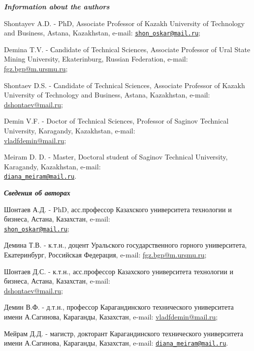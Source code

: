 \begin{authorinfo}
\emph{{\bfseries Information about the authors}}

Shontayev A.D. - PhD, Associate Professor of Kazakh University of
Technology and Business, Astana, Kazakhstan, e-mail: \href{mailto:shon_oskar@mail.ru}{\nolinkurl{shon\_oskar@mail.ru}};

Demina T.V. - Сandidate of Technical Sciences, Associate Professor of
Ural State Mining University, Ekaterinburg, Russian Federation, 
e-mail: \href{mailto:baiz76@mail.ru}{fgz.bgp@m.ursmu.ru};

Shontaev D.S. - Сandidate of Technical Sciences, Associate Professor of
Kazakh University of Technology and Business, Astana, Kazakhstan, 
e-mail: \href{mailto:baiz76@mail.ru}{dshontaev@mail.ru};

Demin V.F. - Doctor of Technical Sciences, Professor of Saginov
Technical University, Karagandy, Kazakhstan, 
e-mail: \\\href{mailto:diana_meiram@mail.ru}{vladfdemin@mail.ru};

Meiram D. D. - Master, Doctoral student of Saginov Technical University,
Karagandy, Kazakhstan, e-mail: \\\href{mailto:diana_meiram@mail.ru}{\nolinkurl{diana\_meiram@mail.ru}}.

\emph{{\bfseries Сведения об авторах}}

Шонтаев А.Д. - PhD, асс.профессор Казахского университета технологии и
бизнеса, Астана, Казахстан,
e-mail: \\\href{mailto:shon_oskar@mail.ru}{\nolinkurl{shon\_oskar@mail.ru}};

Демина Т.В. - к.т.н., доцент Уральского государственного горного
университета, Екатеринбург, Российская Федерация,  e-mail: \href{mailto:baiz76@mail.ru}{fgz.bgp@m.ursmu.ru};

Шонтаев Д.С. - к.т.н., асс.профессор Казахского университета технологии
и бизнеса, Астана, Казахстан, 
e-mail: \\\href{mailto:baiz76@mail.ru}{dshontaev@mail.ru};

Демин В.Ф. - д.т.н., профессор Карагандинского технического университета
имени А.Сагинова, Караганды, Казахстан, 
e-mail: \href{mailto:diana_meiram@mail.ru}{vladfdemin@mail.ru};

Мейрам Д.Д. - магистр, докторант Карагандинского технического
университета имени А.Сагинова, Караганды, Казахстан, 
e-mail: \href{mailto:diana_meiram@mail.ru}{\nolinkurl{diana\_meiram@mail.ru}}.
\end{authorinfo}
